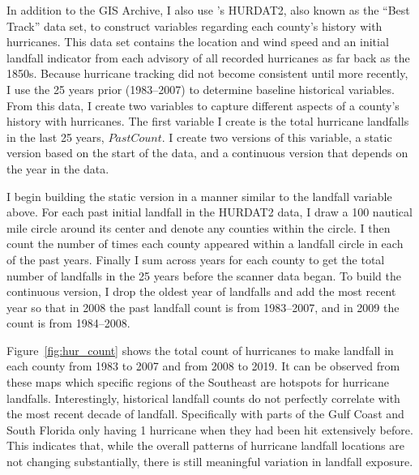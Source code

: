 \documentclass{article}
\begin{document}
In addition to the GIS Archive, I also use \citeauthor{HURDAT2}'s HURDAT2, also known as the ``Best Track'' data set, to construct variables regarding each county's history with hurricanes. This data set contains the location and wind speed and an initial landfall indicator from each advisory of all recorded hurricanes as far back as the 1850s. Because hurricane tracking did not become consistent until more recently, I use the 25 years prior (1983--2007) to determine baseline historical variables. From this data, I create two variables to capture different aspects of a county's history with hurricanes. The first variable I create is the total hurricane landfalls in the last 25 years, $PastCount$. I create two versions of this variable, a static version based on the start of the data, and a continuous version that depends on the year in the data. 

I begin building the static version in a manner similar to the landfall variable above. For each past initial landfall in the HURDAT2 data, I draw a 100 nautical mile circle around its center and denote any counties within the circle. I then count the number of times each county appeared within a landfall circle in each of the past years. Finally I sum across years for each county to get the total number of landfalls in the 25 years before the scanner data began. To build the continuous version, I drop the oldest year of landfalls and add the most recent year so that in 2008 the past landfall count is from 1983--2007, and in 2009 the count is from 1984--2008. %

Figure~\ref{fig:hur_count} shows the total count of hurricanes to make landfall in each county from 1983 to 2007 and from 2008 to 2019. It can be observed from these maps which specific regions of the Southeast are hotspots for hurricane landfalls. Interestingly, historical landfall counts do not perfectly correlate with the most recent decade of landfall. Specifically with parts of the Gulf Coast and South Florida only having 1 hurricane when they had been hit extensively before. This indicates that, while the overall patterns of hurricane landfall locations are not changing substantially, there is still meaningful variation in landfall exposure. 
\end{document}
